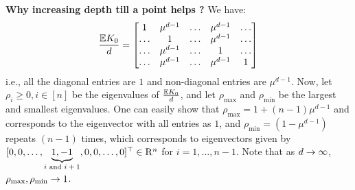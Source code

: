 \textbf{Why increasing depth till a point helps ?} 
We have:
\begin{align}\label{eq:mat}
\frac{\mathbb{E}{K_0}}{d}=\left[\begin{matrix}
1 &\mu^{d-1} &\ldots &\mu^{d-1} &\ldots\\ 
\ldots &1 &\ldots &\mu^{d-1} &\ldots\\ 
\ldots &\mu^{d-1} &\ldots &1 &\ldots \\
\ldots &\mu^{d-1} &\ldots &\mu^{d-1} &1\\ 
\end{matrix}\right]
\end{align}
i.e., all the diagonal entries are $1$ and non-diagonal entries are $\mu^{d-1}$. Now, let $\rho_i\geq 0,i \in [n]$ be the eigenvalues of $\frac{\mathbb{E}{K_0}}{d}$, and let $\rho_{\max}$ and $\rho_{\min}$ be the largest and smallest eigenvalues.  One can easily show that $\rho_{\max}=1+(n-1)\mu^{d-1}$ and corresponds to the eigenvector with all entries as $1$, and $\rho_{\min}=(1-\mu^{d-1})$ repeats $(n-1)$ times,  which corresponds to eigenvectors given by $[0, 0, \ldots, \underbrace{1, -1}_{\text{$i$ and $i+1$}}, 0,0,\ldots, 0]^\top \in \mathrm{R}^n$ for $i=1,\ldots,n-1$. Note that as $d\rightarrow\infty$, $\rho_{\max},\rho_{\min}\rightarrow 1$.

